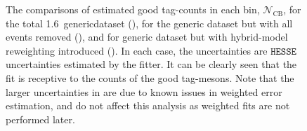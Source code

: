 \begin{figure}[htbp!]
    \caption{\label{fig:mc_fit_yield_comparisons}The comparisons of estimated good tag-\B counts in each \EB bin, $\mathcal{N}_{\mathrm{CB}}$,
    for the total 1.6~\invab generic\MC dataset (),
    for the generic \MC dataset but with all \BtoXsgamma events removed (),
    and for generic \MC dataset but with hybrid-model reweighting introduced ().
    In each case, the uncertainties are $\texttt{HESSE}$ uncertainties estimated by the fitter.
    It can be clearly seen that the fit is receptive to the counts of the good tag-\B mesons.
    Note that the larger uncertainties in  are due to known issues in weighted error estimation,
    and do not affect this analysis as weighted fits are not performed later.
    }
\end{figure}